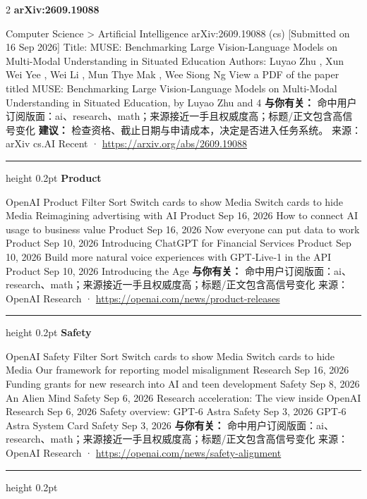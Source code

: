 \documentclass[10.5pt]{ctexart}
\begin{document}
\begin{multicols}{2}
{\large\bfseries arXiv:2609.19088}\par
Computer Science > Artificial Intelligence arXiv:2609.19088 (cs) [Submitted on 16 Sep 2026] Title: MUSE: Benchmarking Large Vision-Language Models on Multi-Modal Understanding in Situated Education Authors: Luyao Zhu , Xun Wei Yee , Wei Li , Mun Thye Mak , Wee Siong Ng View a PDF of the paper titled MUSE: Benchmarking Large Vision-Language Models on Multi-Modal Understanding in Situated Education, by Luyao Zhu and 4 
\textbf{与你有关：} 命中用户订阅版面：ai、research、math；来源接近一手且权威度高；标题/正文包含高信号变化
\textbf{建议：} 检查资格、截止日期与申请成本，决定是否进入任务系统。
{\footnotesize\color{ormuted} 来源：arXiv cs.AI Recent · \url{https://arxiv.org/abs/2609.19088}}
\vspace{2mm}
\hrule height 0.2pt
\vspace{2mm}
{\large\bfseries Product}\par
OpenAI Product Filter Sort Switch cards to show Media Switch cards to hide Media Reimagining advertising with AI Product Sep 16, 2026 How to connect AI usage to business value Product Sep 16, 2026 Now everyone can put data to work Product Sep 10, 2026 Introducing ChatGPT for Financial Services Product Sep 10, 2026 Build more natural voice experiences with GPT‑Live‑1 in the API Product Sep 10, 2026 Introducing the Age
\textbf{与你有关：} 命中用户订阅版面：ai、research、math；来源接近一手且权威度高；标题/正文包含高信号变化
{\footnotesize\color{ormuted} 来源：OpenAI Research · \url{https://openai.com/news/product-releases}}
\vspace{2mm}
\hrule height 0.2pt
\vspace{2mm}
{\large\bfseries Safety}\par
OpenAI Safety Filter Sort Switch cards to show Media Switch cards to hide Media Our framework for reporting model misalignment Research Sep 16, 2026 Funding grants for new research into AI and teen development Safety Sep 8, 2026 An Alien Mind Safety Sep 6, 2026 Research acceleration: The view inside OpenAI Research Sep 6, 2026 Safety overview: GPT-6 Astra Safety Sep 3, 2026 GPT‑6 Astra System Card Safety Sep 3, 2026 
\textbf{与你有关：} 命中用户订阅版面：ai、research、math；来源接近一手且权威度高；标题/正文包含高信号变化
{\footnotesize\color{ormuted} 来源：OpenAI Research · \url{https://openai.com/news/safety-alignment}}
\vspace{2mm}
\hrule height 0.2pt
\vspace{2mm}

\end{multicols}
\end{document}

